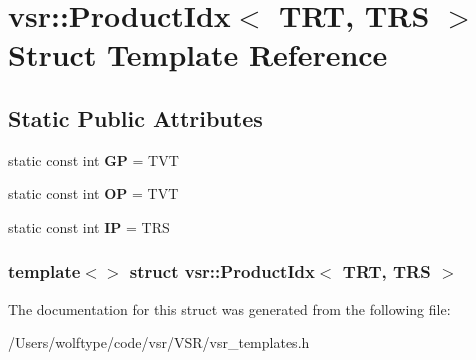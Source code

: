 \hypertarget{structvsr_1_1_product_idx_3_01_t_r_t_00_01_t_r_s_01_4}{\section{vsr\-:\-:Product\-Idx$<$ T\-R\-T, T\-R\-S $>$ Struct Template Reference}
\label{structvsr_1_1_product_idx_3_01_t_r_t_00_01_t_r_s_01_4}
}
\subsection*{Static Public Attributes}
\begin{DoxyCompactItemize}
\item 
\hypertarget{structvsr_1_1_product_idx_3_01_t_r_t_00_01_t_r_s_01_4_aceb2e0023d0e7677a8ca38e14af7df90}{static const int {\bfseries G\-P} = T\-V\-T}\label{structvsr_1_1_product_idx_3_01_t_r_t_00_01_t_r_s_01_4_aceb2e0023d0e7677a8ca38e14af7df90}

\item 
\hypertarget{structvsr_1_1_product_idx_3_01_t_r_t_00_01_t_r_s_01_4_abb40f9d1a003d3e6a550c11b39e4adcd}{static const int {\bfseries O\-P} = T\-V\-T}\label{structvsr_1_1_product_idx_3_01_t_r_t_00_01_t_r_s_01_4_abb40f9d1a003d3e6a550c11b39e4adcd}

\item 
\hypertarget{structvsr_1_1_product_idx_3_01_t_r_t_00_01_t_r_s_01_4_a657137e4f8de7f2d8247635150bbdcef}{static const int {\bfseries I\-P} = T\-R\-S}\label{structvsr_1_1_product_idx_3_01_t_r_t_00_01_t_r_s_01_4_a657137e4f8de7f2d8247635150bbdcef}

\end{DoxyCompactItemize}
\subsubsection*{template$<$$>$ struct vsr\-::\-Product\-Idx$<$ T\-R\-T, T\-R\-S $>$}



The documentation for this struct was generated from the following file\-:\begin{DoxyCompactItemize}
\item 
/\-Users/wolftype/code/vsr/\-V\-S\-R/vsr\-\_\-templates.\-h\end{DoxyCompactItemize}
